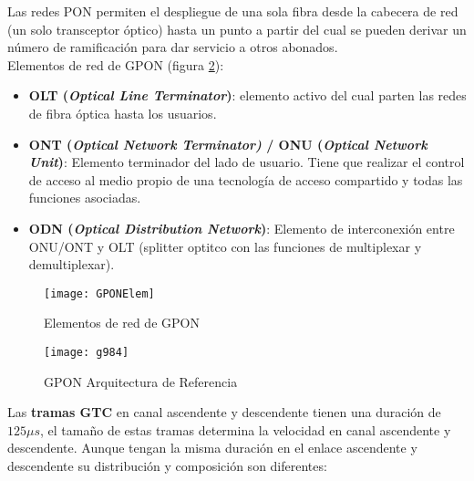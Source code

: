 \documentclass[10pt,portrait, twocolumn]{article}
\begin{document}
Las redes PON permiten el despliegue de una sola fibra desde la cabecera de red (un solo transceptor óptico) hasta un punto a partir del cual se pueden derivar un número de ramificación para dar servicio a otros abonados.\\

Elementos de red de GPON (figura \ref{fig:GPONElem}):

	\begin{itemize}
	\item \textbf{OLT (\textit{Optical Line Terminator})}: elemento activo del cual parten las redes de fibra óptica hasta los usuarios.
	\item \textbf{ONT (\textit{Optical Network Terminator)} / ONU (\textit{Optical Network Unit})}: Elemento terminador del lado de usuario. Tiene que realizar el control de acceso al medio propio de una tecnología de acceso compartido y todas las funciones asociadas.
	\item \textbf{ODN (\textit{Optical Distribution Network})}: Elemento de interconexión entre ONU/ONT y OLT (splitter optitco con las funciones de multiplexar y demultiplexar).
	\end{itemize}
	
\begin{figure}[!ht]	
	\centering
    	\texttt{[image: GPONElem]}
	\caption{Elementos de red de GPON}
	\label{fig:GPONElem}
\end{figure}    	

\begin{figure}[!ht]	
	\centering
    	\texttt{[image: g984]}
	\caption{GPON Arquitectura de Referencia}
	\label{fig:GPONElem}
\end{figure}  

Las \textbf{tramas GTC} en canal ascendente y descendente tienen una duración de $125\mu s$, el tamaño de estas tramas determina la velocidad en canal ascendente y descendente. Aunque tengan la misma duración en el enlace ascendente y descendente su distribución y composición son diferentes:
\end{document}
